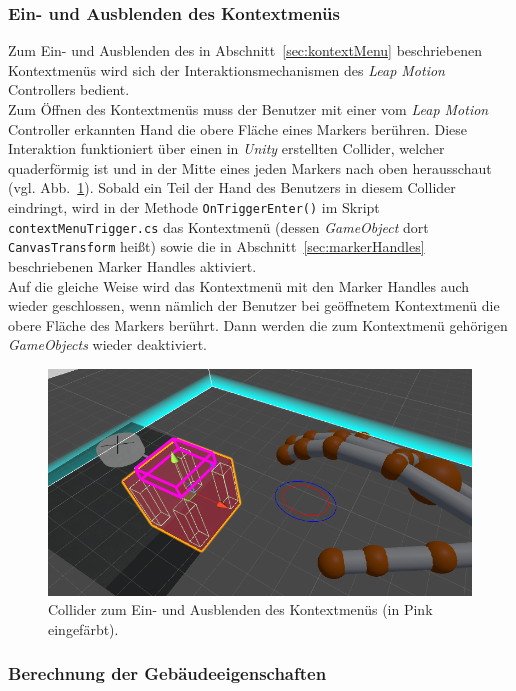 \subsubsection{Ein- und Ausblenden des Kontextmenüs} \label{sec:KontextMenuSwitch}
Zum Ein- und Ausblenden des in Abschnitt~\ref{sec:kontextMenu} beschriebenen Kontextmenüs wird sich der Interaktionsmechanismen des \emph{Leap Motion} Controllers bedient.\\
Zum Öffnen des Kontextmenüs muss der Benutzer mit einer vom \emph{Leap Motion} Controller erkannten Hand die obere Fläche eines Markers berühren. Diese Interaktion funktioniert über einen in \emph{Unity} erstellten Collider, welcher quaderförmig ist und in der Mitte eines jeden Markers nach oben herausschaut (vgl. Abb.~\ref{fig:KontextmenuCollider}). Sobald ein Teil der Hand des Benutzers in diesem Collider eindringt, wird in der Methode \texttt{OnTriggerEnter()} im Skript \texttt{contextMenuTrigger.cs} das Kontextmenü (dessen \emph{GameObject} dort \texttt{CanvasTransform} heißt) sowie die in Abschnitt~\ref{sec:markerHandles} beschriebenen Marker Handles aktiviert.\\
Auf die gleiche Weise wird das Kontextmenü mit den Marker Handles auch wieder geschlossen, wenn nämlich der Benutzer bei geöffnetem Kontextmenü die obere Fläche des Markers berührt. Dann werden die zum Kontextmenü gehörigen \emph{GameObjects} wieder deaktiviert.

\begin{figure}
	\centering
	\includegraphics[width=\textwidth]{Bilder/Contextmenu_Collider}
	\caption{Collider zum Ein- und Ausblenden des Kontextmenüs (in Pink eingefärbt).}
	\label{fig:KontextmenuCollider}
\end{figure}

\subsubsection{Berechnung der Gebäudeeigenschaften} \label{sec:KontextMenuInhalt}


